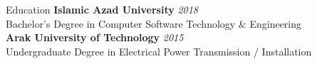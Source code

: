 \documentclass[
	a4paper, %
	12pt, %
]{resume} %
\begin{document}
\begin{rSection}{Education}
	\hypertarget{education}{}
	\textbf{Islamic Azad University} \hfill \textit{2018} \\ 
	Bachelor's Degree in Computer Software Technology \& Engineering \\[2pt]
    \textbf{Arak University of Technology} \hfill \textit{2015} \\ 
	Undergraduate Degree in Electrical Power Transmission / Installation
\end{rSection}
\end{document}
